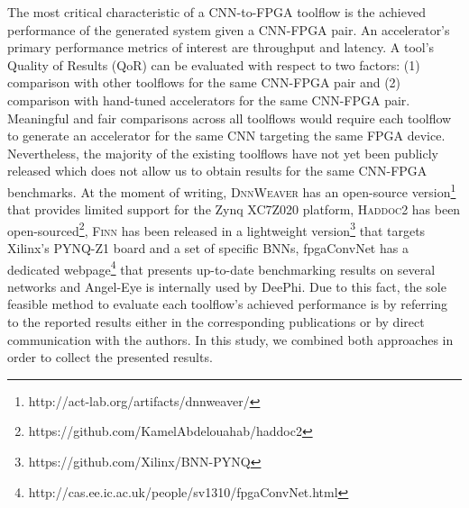 \documentclass[format=acmsmall, review=false, screen=true]{acmart}
\begin{document}
The most critical characteristic of a CNN-to-FPGA toolflow is the achieved performance of the generated system given a CNN-FPGA pair. An accelerator's primary performance metrics of interest are throughput and latency. 
A tool's 
Quality of Results (QoR) can be evaluated with respect to two factors: (1) comparison with other toolflows for the same CNN-FPGA pair and (2) comparison with hand-tuned accelerators for the same CNN-FPGA pair. Meaningful and fair comparisons across all toolflows would require each toolflow to generate an accelerator for the same CNN targeting the same FPGA device. Nevertheless, the majority of the existing toolflows have not yet been publicly released which does not allow us to obtain results for the same CNN-FPGA benchmarks. At the moment of writing, \textsc{DnnWeaver} has an open-source version\footnote{{\color{black}http://act-lab.org/artifacts/dnnweaver/}} that provides limited support for the Zynq XC7Z020 platform, {\color{black}\textsc{Haddoc2} has been open-sourced\footnote{https://github.com/KamelAbdelouahab/haddoc2}}, \textsc{Finn} has been released in a lightweight version\footnote{{\color{black}https://github.com/Xilinx/BNN-PYNQ}} that targets Xilinx's PYNQ-Z1 board and a set of specific BNNs, fpgaConvNet has a dedicated webpage\footnote{{\color{black}http://cas.ee.ic.ac.uk/people/sv1310/fpgaConvNet.html}} that presents up-to-date benchmarking results on several networks and Angel-Eye is internally used by DeePhi. Due to this fact, the sole feasible method to evaluate each toolflow's achieved performance is by referring to the reported results either in the corresponding publications or by direct communication with the authors. In this study, we combined both approaches in order to collect the presented results.

\addtolength{\tabcolsep}{0pt} %
	
\end{document}
